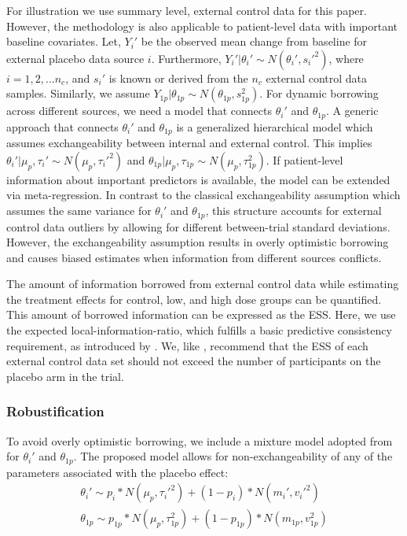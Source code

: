 For illustration we use summary level, external control data for this paper. However, the methodology is also applicable to patient-level data with important baseline covariates. Let, $Y_i'$ be the observed mean change from baseline for external placebo data source $i$. Furthermore, $Y_{i}'|\theta_{i}' \sim N(\theta_{i}', s_{i}'^2)$, where $i = 1, 2, ...n_c$, and $s_i'$ is known or derived from the $n_c$ external control data samples. Similarly, we assume $Y_{1p}|\theta_{1p} \sim N(\theta_{1p}, s_{1p}^2)$. For dynamic borrowing across different sources, we need a model that connects $\theta_i'$ and $\theta_{1p}$. A generic approach that connects $\theta_i'$ and $\theta_{1p}$ is a generalized hierarchical model which assumes exchangeability between internal and external control. This implies $\theta_{i}' |\mu_p, \tau_i' \sim N(\mu_p, \tau_i'^2)$ and $\theta_{1p}|\mu_p,\tau_{1p} \sim N(\mu_p, \tau_{1p}^2)$. If patient-level information about important predictors is available, the model can be extended via meta-regression. In contrast to the classical exchangeability assumption which assumes the same variance for $\theta_{i}'$ and $\theta_{1p}$, this structure accounts for external control data outliers by allowing for different between-trial standard deviations. However,  the exchangeability assumption results in overly optimistic borrowing and causes biased estimates when information from different sources conflicts. 

The amount of information borrowed from external control data while estimating the treatment effects for control, low, and high dose groups can be quantified. This amount of borrowed information can be expressed as the \ac{ESS}. Here, we use the expected local-information-ratio, which fulfills a basic predictive consistency requirement, as introduced by \cite{neuenschwander2020predictively}. We, like \cite{neuenschwander2020predictively}, recommend that the \ac{ESS} of each external control data set should not exceed the number of participants on the placebo arm in the trial. 

\subsubsection{Robustification} \label{sec:robust}
To avoid overly optimistic borrowing, we include a mixture model adopted from \cite{neuenschwander2016use} for $\theta_i'$ and $\theta_{1p}$.  The proposed model allows for non-exchangeability of any of the parameters associated with the placebo effect: 
\begin{eqnarray*}
\theta_i' \sim p_{i}*N(\mu_p, \tau_{i}'^2) + (1-p_{i})*N(m_i', v_i'^2) \\
\theta_{1p} \sim p_{1p}*N(\mu_p, \tau_{1p}^2) + (1-p_{1p})*N(m_{1p}, v_{1p}^2)
\end{eqnarray*}

